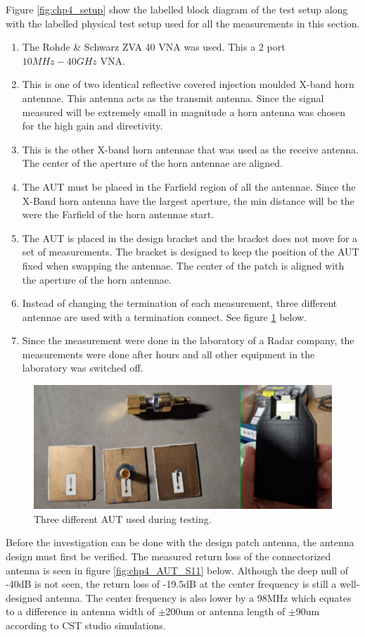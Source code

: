 Figure \ref{fig:chp4_setup} show the labelled block diagram of the test setup along with the labelled physical test setup used for all the measurements in this section.
\begin{enumerate}
    \item The Rohde \& Schwarz ZVA 40 VNA was used. This a 2 port \(10MHz-40GHz\) VNA.
    \item This is one of two identical reflective covered injection moulded X-band horn antennae. This antenna acts as the transmit antenna. Since the signal measured will be extremely small in magnitude a horn antenna was chosen for the high gain and directivity.
    \item This is the other X-band horn antennae that was used as the receive antenna. The center of the aperture of the horn antennae are aligned.
    \item The AUT must be placed in the Farfield region of all the antennae. Since the X-Band horn antenna have the largest aperture, the min distance will be the were the Farfield of the horn antennae start.
    \item The AUT is placed in the design bracket and the bracket does not move for a set of measurements. The bracket is designed to keep the position of the AUT fixed when swapping the antennae. The center of the patch is aligned with the aperture of the horn antennae.
    \item Instead of changing the termination of each measurement, three different antennae are used with a termination connect. See figure \ref{fig:chp4_AUTs} below.
    \item Since the measurement were done in the laboratory of a Radar company, the measurements were done after hours and all other equipment in the laboratory was switched off. 
\end{enumerate}

    \begin{figure}[H]
    \centering
    \includegraphics[width=0.5\linewidth]{Figures/chp4_AUTs.png}
    \caption{Three different AUT used during testing.}
    \label{fig:chp4_AUTs}
    \end{figure}

Before the investigation can be done with the design patch antenna, the antenna design must first be verified. The measured return loss of the connectorized antenna is seen in figure \ref{fig:chp4_AUT_S11} below. Although the deep null of -40dB is not seen, the return loss of -19.5dB at the center frequency is still a well-designed antenna. The center frequency is also lower by a 98MHz which equates to a difference in antenna width of $\pm$200um or antenna length of $\pm$90um according to CST studio simulations.

